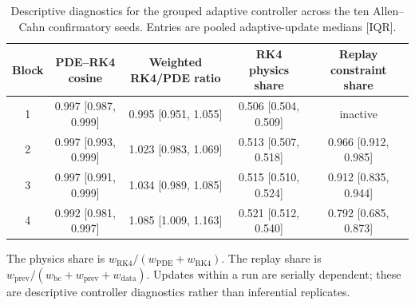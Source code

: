 \begin{table}[t]
\centering
\caption{Descriptive diagnostics for the grouped adaptive controller across the ten Allen--Cahn confirmatory seeds. Entries are pooled adaptive-update medians [IQR].}
\label{tab:allen_cahn_controller_mechanism}
\small
\begin{tabular}{ccccc}
\toprule
Block & PDE--RK4 cosine & Weighted RK4/PDE ratio & RK4 physics share & Replay constraint share \\
\midrule
1 & 0.997 [0.987, 0.999] & 0.995 [0.951, 1.055] & 0.506 [0.504, 0.509] & inactive \\
2 & 0.997 [0.993, 0.999] & 1.023 [0.983, 1.069] & 0.513 [0.507, 0.518] & 0.966 [0.912, 0.985] \\
3 & 0.997 [0.991, 0.999] & 1.034 [0.989, 1.085] & 0.515 [0.510, 0.524] & 0.912 [0.835, 0.944] \\
4 & 0.992 [0.981, 0.997] & 1.085 [1.009, 1.163] & 0.521 [0.512, 0.540] & 0.792 [0.685, 0.873] \\
\bottomrule
\end{tabular}
\vspace{2pt}
\begin{minipage}{0.96\linewidth}\footnotesize
The physics share is $w_{\mathrm{RK4}}/(w_{\mathrm{PDE}}+w_{\mathrm{RK4}})$. The replay share is $w_{\mathrm{prev}}/(w_{\mathrm{bc}}+w_{\mathrm{prev}}+w_{\mathrm{data}})$. Updates within a run are serially dependent; these are descriptive controller diagnostics rather than inferential replicates.
\end{minipage}
\end{table}
